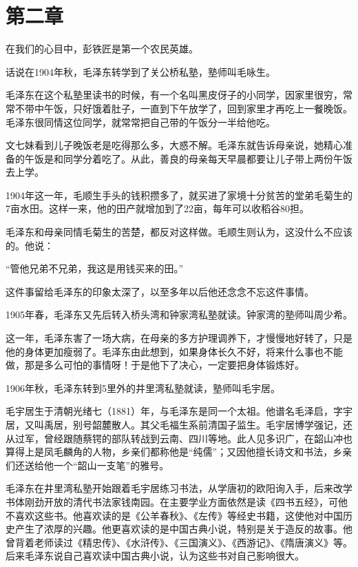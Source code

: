 \documentclass[../../dazhuan.tex]{subfiles}
\begin{document}
\chapter*{第二章}

\begin{pref}
	在我们的心目中，彭铁匠是第一个农民英雄。
\end{pref}

话说在1904年秋，毛泽东转学到了关公桥私塾，塾师叫毛咏生。

毛泽东在这个私塾里读书的时候，有一个名叫黑皮伢子的小同学，因家里很穷，常常不带中午饭，只好饿着肚子，一直到下午放学了，回到家里才再吃上一餐晚饭。毛泽东很同情这位同学，就常常把自己带的午饭分一半给他吃。

文七妹看到儿子晚饭老是吃得那么多，大惑不解。毛泽东就告诉母亲说，她精心准备的午饭是和同学分着吃了。从此，善良的母亲每天早晨都要让儿子带上两份午饭去上学。

1904年这一年，毛顺生手头的钱积攒多了，就买进了家境十分贫苦的堂弟毛菊生的7亩水田。这样一来，他的田产就增加到了22亩，每年可以收稻谷80担。

毛泽东和母亲同情毛菊生的苦楚，都反对这样做。毛顺生则认为，这没什么不应该的。他说：

“管他兄弟不兄弟，我这是用钱买来的田。”

这件事留给毛泽东的印象太深了，以至多年以后他还念念不忘这件事情。

1905年春，毛泽东又先后转入桥头湾和钟家湾私塾就读。钟家湾的塾师叫周少希。

这一年，毛泽东害了一场大病，在母亲的多方护理调养下，才慢慢地好转了，只是他的身体更加瘦弱了。毛泽东由此想到，如果身体长久不好，将来什么事也不能做，那是多么可怕的事情呀！于是他下了决心，一定要把身体锻炼好。

1906年秋，毛泽东转到5里外的井里湾私塾就读，塾师叫毛宇居。

毛宇居生于清朝光绪七（1881）年，与毛泽东是同一个太祖。他谱名毛泽启，字宇居，又叫禹居，别号韶麓散人。其父毛福生系前清国子监生。毛宇居博学强记，还从过军，曾经跟随蔡锷的部队转战到云南、四川等地。此人见多识广，在韶山冲也算得上是凤毛麟角的人物，乡亲们都称他是“纯儒”；又因他擅长诗文和书法，乡亲们还送给他一个“韶山一支笔”的雅号。

毛泽东在井里湾私塾开始跟着毛宇居练习书法，从学唐初的欧阳询入手，后来改学书体刚劲开放的清代书法家钱南园。在主要学业方面依然是读《四书五经》，可他不喜欢这些书。他喜欢读的是《公羊春秋》、《左传》等经史书籍，这使他对中国历史产生了浓厚的兴趣。他更喜欢读的是中国古典小说，特别是关于造反的故事。他曾背着老师读过《精忠传》、《水浒传》、《三国演义》、《西游记》、《隋唐演义》等。后来毛泽东说自己喜欢读中国古典小说，认为这些书对自己影响很大。
\end{document}
